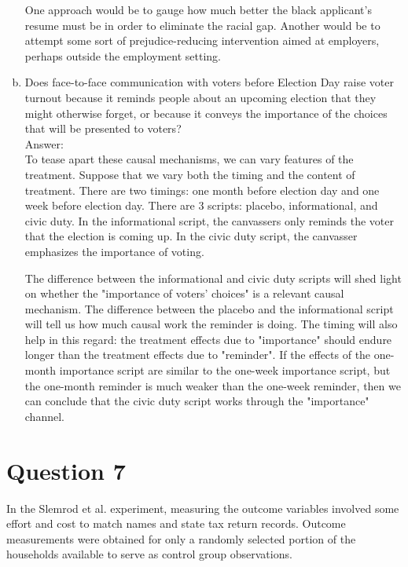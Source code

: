 \documentclass[11pt,notitlepage]{article}\usepackage[]{graphicx}\usepackage[]{color}
\begin{document}
\begin{enumerate}[a)]
One approach would be to gauge how much better the black applicant's resume must be in order to eliminate the racial gap.  Another would be to attempt some sort of prejudice-reducing intervention aimed at employers, perhaps outside the employment setting.
\item Does face-to-face communication with voters before Election Day raise voter turnout because it reminds people about an upcoming election that they might otherwise forget, or because it conveys the importance of the choices that will be presented to voters?\\
Answer:\\

To tease apart these causal mechanisms, we can vary features of the treatment.  Suppose that we vary both the timing and the content of treatment. There are two timings: one month before election day and one week before election day.  There are 3 scripts: placebo, informational, and civic duty.  In the informational script, the canvassers only reminds the voter that the election is coming up.  In the civic duty script, the canvasser emphasizes the importance of voting.  

The difference between the informational and civic duty scripts will shed light on whether the "importance of voters' choices" is a relevant causal mechanism.  The difference between the placebo and the informational script will tell us how much causal work the reminder is doing. The timing will also help in this regard: the treatment effects due to "importance" should endure longer than the treatment effects due to "reminder". If the effects of the one-month importance script are similar to the one-week importance script, but the one-month reminder is much weaker than the one-week reminder, then we can conclude that the civic duty script works through the "importance" channel.



\end{enumerate}
\section*{Question 7}
In the Slemrod et al. experiment, measuring the outcome variables involved some effort and cost to match names and state tax return records. Outcome measurements were obtained for only a randomly selected portion of the households available to serve as control group observations.
\end{document}
